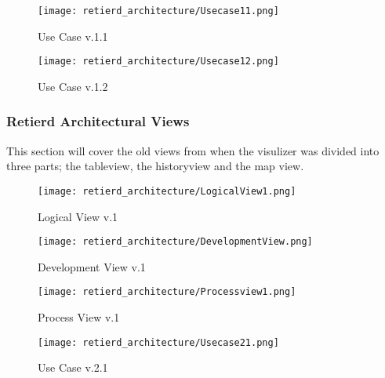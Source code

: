\documentclass[../document]{subfiles}
\begin{document}
\begin{figure}[H]
	\centering
	\texttt{[image: retierd\_architecture/Usecase11.png]}
	\caption{Use Case v.1.1}
\end{figure}

\begin{figure}[H]
	\centering
	\texttt{[image: retierd\_architecture/Usecase12.png]}
	\caption{Use Case v.1.2}
\end{figure}

\subsubsection{Retierd Architectural Views}
\label{retierd_architectural_views}
This section will cover the old views from when the visulizer was divided into three parts; the tableview, the historyview and the map view. 


\begin{figure}[H]
	\centering
	\texttt{[image: retierd\_architecture/LogicalView1.png]}
	\caption{Logical View v.1}
\end{figure}

\begin{figure}[H]
	\centering
	\texttt{[image: retierd\_architecture/DevelopmentView.png]}
	\caption{Development View v.1}
\end{figure}


\begin{figure}[H]
	\centering
	\texttt{[image: retierd\_architecture/Processview1.png]}
	\caption{Process View v.1}
\end{figure}

\begin{figure}[H]
	\centering
	\texttt{[image: retierd\_architecture/Usecase21.png]}
	\caption{Use Case v.2.1}
\end{figure}
\end{document}
